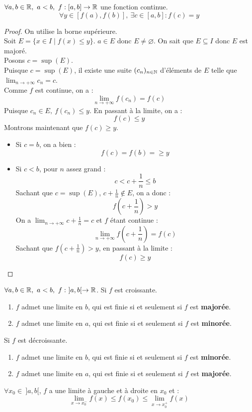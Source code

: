 \begin{theorem}
	$\forall a, b \in \mathbb{R},\ a < b,\ f : [a, b] \to \mathbb{R}$ une fonction continue.
	\[ \forall y \in [f(a), f(b)],\ \exists c \in [a, b] : f(c) = y \]
\end{theorem}

\begin{proof}
	On utilise la borne supérieure.
	\\
	Soit $E = \{ x \in I \mid f(x) \leq y \}$. $a \in E$ donc $E \neq \varnothing$. On sait que $E \subseteq I$ donc $E$ est majoré.
	\\
	Posons $c = \sup(E)$.
	\\
	Puisque $c = \sup(E)$, il existe une suite $(c_n)_{n \in \mathbb{N}}$ d'éléments de $E$ telle que $\lim_{n \to +\infty} c_n = c$. 
	\\
	Comme $f$ est continue, on a :
	\[ \lim_{n \to +\infty} f(c_n) = f(c) \] 
	Puisque $c_n \in E,\ f(c_n) \leq y$. En passant à la limite, on a :
	\[ f(c) \leq y \]
	Montrons maintenant que $f(c) \geq y$.
	\begin{itemize}
		\item Si $c = b$, on a bien :
		\[ f(c) = f(b) = \geq y \]
		\item Si $c < b$, pour $n$ assez grand :
		\[ c < c + \frac{1}{n} \leq b \]
		Sachant que $c = \sup(E)$, $c + \frac{1}{n} \notin E$, on a donc :
		\[ f \left( c + \frac{1}{n} \right) > y \]
		On a $\lim_{n \to +\infty} c + \frac{1}{n} = c$ et $f$ étant continue :
		\[ \lim_{n \to +\infty} f \left( c + \frac{1}{n} \right) = f(c) \]
		Sachant que $f \left( c + \frac{1}{n} \right) > y$, en passant à la limite :
		\[ f(c) \geq y \]
	\end{itemize}
\end{proof}

\begin{theorem}
	$\forall a, b \in \mathbb{R},\ a < b,\ f :\ ]a, b[ \to \mathbb{R}$. 
	Si $f$ est croissante.
	\begin{enumerate}
		\item $f$ admet une limite en $b$, qui est finie si et seulement si $f$ est \textbf{majorée}.
		\item $f$ admet une limite en $a$, qui est finie si et seulement si $f$ est \textbf{minorée}.
	\end{enumerate}
	Si $f$ est décroissante.
	\begin{enumerate}
		\item $f$ admet une limite en $b$, qui est finie si et seulement si $f$ est \textbf{minorée}.
		\item $f$ admet une limite en $a$, qui est finie si et seulement si $f$ est \textbf{majorée}.
	\end{enumerate}
	$\forall x_0 \in \ ]a, b[$, $f$ a une limite à gauche et à droite en $x_0$ et :
	\[ \lim_{x \to x_0^-} f(x) \leq f(x_0) \leq \lim_{x \to x_0^+} f(x) \]
\end{theorem}

